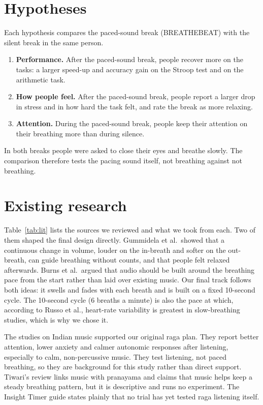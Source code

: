 \documentclass[11pt,a4paper]{article}
\begin{document}
\section{Hypotheses}

Each hypothesis compares the paced-sound break (BREATHEBEAT) with the silent break in the same person.

\begin{enumerate}[label=\textbf{H\arabic*.}]
\item \textbf{Performance.} After the paced-sound break, people recover more on the tasks: a larger speed-up and accuracy gain on the Stroop test and on the arithmetic task.
\item \textbf{How people feel.} After the paced-sound break, people report a larger drop in stress and in how hard the task felt, and rate the break as more relaxing.
\item \textbf{Attention.} During the paced-sound break, people keep their attention on their breathing more than during silence.
\end{enumerate}

\noindent In both breaks people were asked to close their eyes and breathe slowly. The comparison therefore tests the pacing sound itself, not breathing against not breathing.

\section{Existing research}

Table~\ref{tab:lit} lists the sources we reviewed and what we took from each. Two of them shaped the final design directly. Gummidela et al.\ showed that a continuous change in volume, louder on the in-breath and softer on the out-breath, can guide breathing without counts, and that people felt relaxed afterwards. Burns et al.\ argued that audio should be built around the breathing pace from the start rather than laid over existing music. Our final track follows both ideas: it swells and fades with each breath and is built on a fixed 10-second cycle. The 10-second cycle (6 breaths a minute) is also the pace at which, according to Russo et al., heart-rate variability is greatest in slow-breathing studies, which is why we chose it.

The studies on Indian music supported our original raga plan. They report better attention, lower anxiety and calmer autonomic responses after listening, especially to calm, non-percussive music. They test listening, not paced breathing, so they are background for this study rather than direct support. Tiwari's review links music with pranayama and claims that music helps keep a steady breathing pattern, but it is descriptive and runs no experiment. The Insight Timer guide states plainly that no trial has yet tested raga listening itself.
\end{document}
